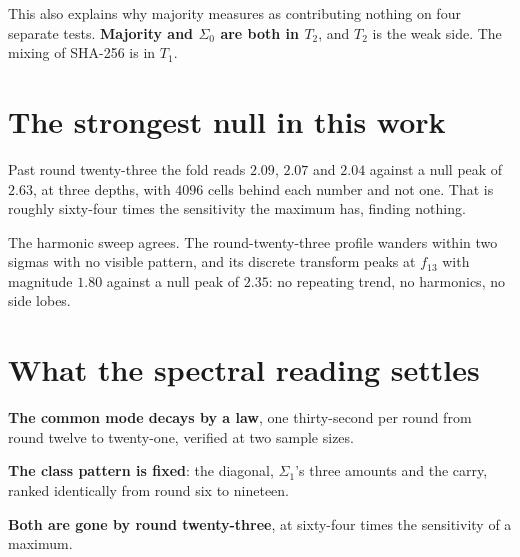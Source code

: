 This also explains why majority measures as contributing nothing on four separate tests. \textbf{Majority and \(\Sigma_0\) are both in \(T_2\)}, and \(T_2\) is the weak side. The mixing of SHA-256 is in \(T_1\).

\section{The strongest null in this work}

Past round twenty-three the fold reads \(2.09\), \(2.07\) and \(2.04\) against a null peak of \(2.63\), at three depths, with \(4096\) cells behind each number and not one. That is roughly sixty-four times the sensitivity the maximum has, finding nothing.

The harmonic sweep agrees. The round-twenty-three profile wanders within two sigmas with no visible pattern, and its discrete transform peaks at \(f_{13}\) with magnitude \(1.80\) against a null peak of \(2.35\): no repeating trend, no harmonics, no side lobes.

\section{What the spectral reading settles}

\textbf{The common mode decays by a law}, one thirty-second per round from round twelve to twenty-one, verified at two sample sizes.

\textbf{The class pattern is fixed}: the diagonal, \(\Sigma_1\)'s three amounts and the carry, ranked identically from round six to nineteen.

\textbf{Both are gone by round twenty-three}, at sixty-four times the sensitivity of a maximum.
